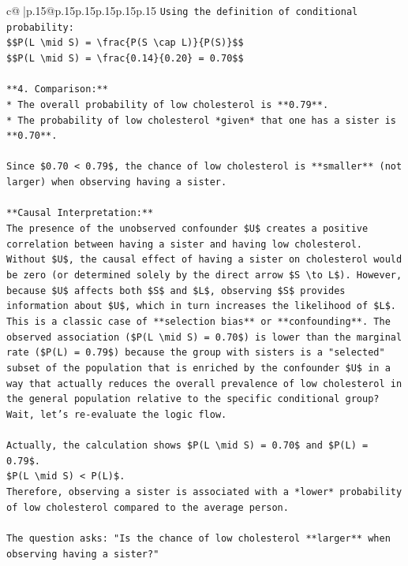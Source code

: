 \documentclass{article}
\begin{document}
{\begin{supertabular}{c@{$\;$}|p{.15\linewidth}@{}p{.15\linewidth}p{.15\linewidth}p{.15\linewidth}p{.15\linewidth}p{.15\linewidth}}
{{{\texttt{Using the definition of conditional probability:} \\
\texttt{\$\$P(L \textbackslash{}mid S) = \textbackslash{}frac\{P(S \textbackslash{}cap L)\}\{P(S)\}\$\$} \\
\texttt{\$\$P(L \textbackslash{}mid S) = \textbackslash{}frac\{0.14\}\{0.20\} = 0.70\$\$} \\
\\ 
\texttt{**4. Comparison:**} \\
\texttt{*   The overall probability of low cholesterol is **0.79**.} \\
\texttt{*   The probability of low cholesterol *given* that one has a sister is **0.70**.} \\
\\ 
\texttt{Since \$0.70 < 0.79\$, the chance of low cholesterol is **smaller** (not larger) when observing having a sister.} \\
\\ 
\texttt{**Causal Interpretation:**} \\
\texttt{The presence of the unobserved confounder \$U\$ creates a positive correlation between having a sister and having low cholesterol. Without \$U\$, the causal effect of having a sister on cholesterol would be zero (or determined solely by the direct arrow \$S \textbackslash{}to L\$). However, because \$U\$ affects both \$S\$ and \$L\$, observing \$S\$ provides information about \$U\$, which in turn increases the likelihood of \$L\$. This is a classic case of **selection bias** or **confounding**. The observed association (\$P(L \textbackslash{}mid S) = 0.70\$) is lower than the marginal rate (\$P(L) = 0.79\$) because the group with sisters is a "selected" subset of the population that is enriched by the confounder \$U\$ in a way that actually reduces the overall prevalence of low cholesterol in the general population relative to the specific conditional group? Wait, let's re{-}evaluate the logic flow.} \\
\\ 
\texttt{Actually, the calculation shows \$P(L \textbackslash{}mid S) = 0.70\$ and \$P(L) = 0.79\$.} \\
\texttt{\$P(L \textbackslash{}mid S) < P(L)\$.} \\
\texttt{Therefore, observing a sister is associated with a *lower* probability of low cholesterol compared to the average person.} \\
\\ 
\texttt{The question asks: "Is the chance of low cholesterol **larger** when observing having a sister?"} \\
}}}
\end{supertabular}}
\end{document}
